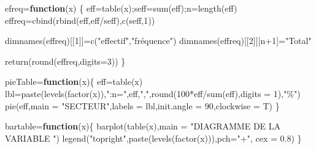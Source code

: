 \documentclass[
]{article}
\newenvironment{Shaded}{\begin{snugshade}}{\end{snugshade}}
\newcommand{\AttributeTok}[1]{\textcolor[rgb]{0.77,0.63,0.00}{#1}}
\newcommand{\ControlFlowTok}[1]{\textcolor[rgb]{0.13,0.29,0.53}{\textbf{#1}}}
\newcommand{\DecValTok}[1]{\textcolor[rgb]{0.00,0.00,0.81}{#1}}
\newcommand{\FloatTok}[1]{\textcolor[rgb]{0.00,0.00,0.81}{#1}}
\newcommand{\FunctionTok}[1]{\textcolor[rgb]{0.00,0.00,0.00}{#1}}
\newcommand{\NormalTok}[1]{#1}
\newcommand{\OtherTok}[1]{\textcolor[rgb]{0.56,0.35,0.01}{#1}}
\newcommand{\SpecialCharTok}[1]{\textcolor[rgb]{0.00,0.00,0.00}{#1}}
\newcommand{\StringTok}[1]{\textcolor[rgb]{0.31,0.60,0.02}{#1}}
\begin{document}
\begin{Shaded}
\begin{Highlighting}[]
\NormalTok{efreq}\OtherTok{=}\ControlFlowTok{function}\NormalTok{(x)}
\NormalTok{\{}
\NormalTok{    eff}\OtherTok{=}\FunctionTok{table}\NormalTok{(x);seff}\OtherTok{=}\FunctionTok{sum}\NormalTok{(eff);n}\OtherTok{=}\FunctionTok{length}\NormalTok{(eff)}
\NormalTok{    effreq}\OtherTok{=}\FunctionTok{cbind}\NormalTok{(}\FunctionTok{rbind}\NormalTok{(eff,eff}\SpecialCharTok{/}\NormalTok{seff),}\FunctionTok{c}\NormalTok{(seff,}\DecValTok{1}\NormalTok{))}
    
    \FunctionTok{dimnames}\NormalTok{(effreq)[[}\DecValTok{1}\NormalTok{]]}\OtherTok{=}\FunctionTok{c}\NormalTok{(}\StringTok{"effectif"}\NormalTok{,}\StringTok{"fréquence"}\NormalTok{)}
    \FunctionTok{dimnames}\NormalTok{(effreq)[[}\DecValTok{2}\NormalTok{]][n}\SpecialCharTok{+}\DecValTok{1}\NormalTok{]}\OtherTok{=}\StringTok{"Total"}
    
    \FunctionTok{return}\NormalTok{(}\FunctionTok{round}\NormalTok{(effreq,}\AttributeTok{digits=}\DecValTok{3}\NormalTok{))}
\NormalTok{\}}

\NormalTok{pieTable}\OtherTok{=}\ControlFlowTok{function}\NormalTok{(x)\{}
\NormalTok{   eff}\OtherTok{=}\FunctionTok{table}\NormalTok{(x)}
\NormalTok{   lbl}\OtherTok{=}\FunctionTok{paste}\NormalTok{(}\FunctionTok{levels}\NormalTok{(}\FunctionTok{factor}\NormalTok{(x)),}\StringTok{":n="}\NormalTok{,eff,}\StringTok{","}\NormalTok{,}\FunctionTok{round}\NormalTok{(}\DecValTok{100}\SpecialCharTok{*}\NormalTok{eff}\SpecialCharTok{/}\FunctionTok{sum}\NormalTok{(eff),}\AttributeTok{digits =} \DecValTok{1}\NormalTok{),}\StringTok{"\%"}\NormalTok{)}
   \FunctionTok{pie}\NormalTok{(eff,}\AttributeTok{main =} \StringTok{"SECTEUR"}\NormalTok{,}\AttributeTok{labels =}\NormalTok{ lbl,}\AttributeTok{init.angle =} \DecValTok{90}\NormalTok{,}\AttributeTok{clockwise =}\NormalTok{ T) }
\NormalTok{\} }

\NormalTok{bartable}\OtherTok{=}\ControlFlowTok{function}\NormalTok{(x)\{}
  \FunctionTok{barplot}\NormalTok{(}\FunctionTok{table}\NormalTok{(x),}\AttributeTok{main =} \StringTok{"DIAGRAMME DE LA VARIABLE "}\NormalTok{)}
  \FunctionTok{legend}\NormalTok{(}\StringTok{"topright"}\NormalTok{,}\FunctionTok{paste}\NormalTok{(}\FunctionTok{levels}\NormalTok{(}\FunctionTok{factor}\NormalTok{(x))),}\AttributeTok{pch=}\StringTok{"+"}\NormalTok{, }\AttributeTok{cex =} \FloatTok{0.8}\NormalTok{)}
\NormalTok{\}}
\end{Highlighting}
\end{Shaded}
\end{document}
